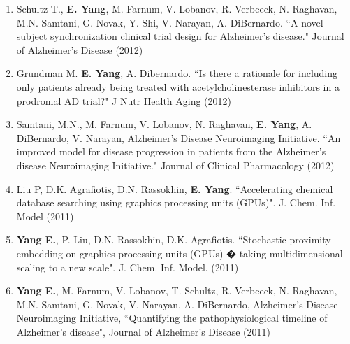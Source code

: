 \documentclass[letterpaper,9pt]{article}
\begin{document}
\begin{enumerate}
\item{{\small Schultz T., \textbf{E. Yang}, M. Farnum, V. Lobanov, R. Verbeeck, N. Raghavan, M.N. Samtani, G. Novak, Y. Shi, V. Narayan, A. DiBernardo. ``A novel subject synchronization clinical trial design for Alzheimer's disease." Journal of Alzheimer's Disease (2012)}}

\item{{\small Grundman M. \textbf{E. Yang}, A. Dibernardo. ``Is there a rationale for including only patients already being treated with acetylcholinesterase inhibitors in a prodromal AD trial?" J Nutr Health Aging (2012)}}

\item{{\small Samtani, M.N., M. Farnum, V. Lobanov, N. Raghavan, \textbf{E. Yang},  A. DiBernardo, V. Narayan, Alzheimer's Disease Neuroimaging Initiative. ``An improved model for disease progression in patients from the Alzheimer's disease Neuroimaging Initiative." Journal of Clinical Pharmacology (2012)}}

 \item{{\small Liu P, D.K. Agrafiotis, D.N. Rassokhin, \textbf{E. Yang}.  ``Accelerating chemical database searching using graphics processing units (GPUs)". J. Chem. Inf. Model (2011)}}

\item{{\small \textbf{Yang E.}, P. Liu, D.N. Rassokhin, D.K. Agrafiotis. ``Stochastic proximity embedding on graphics processing units (GPUs) � taking multidimensional scaling to a new scale". J. Chem. Inf. Model. (2011)}}

\item{{\small \textbf{Yang E.}, M. Farnum, V. Lobanov, T. Schultz, R. Verbeeck, N. Raghavan, M.N. Samtani, G. Novak, V. Narayan, A. DiBernardo, Alzheimer's Disease Neuroimaging Initiative, ``Quantifying the pathophysiological timeline of Alzheimer's disease", Journal of Alzheimer's Disease (2011)}}


\end{enumerate}
\end{document}
